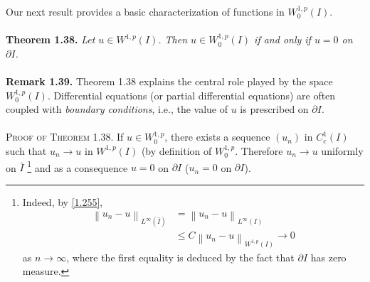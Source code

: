 \documentclass[a4paper,oneside]{article}
\numberwithin{equation}{section}
\begin{document}
Our next result provides a basic characterization of functions in $W_0^{1,p}\left(I\right)$.\\
\\
\textbf{Theorem 1.38.} \textit{Let $u\in W^{1,p}\left(I\right)$. Then $u\in W_0^{1,p}\left(I\right)$ if and only if $u=0$ on $\partial I$.}\\
\\
\textbf{Remark 1.39.} Theorem 1.38 explains the central role played by the space $W_0^{1,p}\left(I\right)$. Differential equations (or partial differential equations) are often coupled with \textit{boundary conditions}, i.e., the value of $u$ is prescribed on $\partial I$.\\
\\
\textsc{Proof of Theorem 1.38.} If $u\in W_0^{1,p}$, there exists a sequence $\left(u_n\right)$ in $C_c^1\left(I\right)$ such that $u_n\to u$ in $W^{1,p}\left(I\right)$ (by definition of $W_0^{1,p}$. Therefore $u_n\to u$ uniformly on $\bar{I}$  \footnote{Indeed, by \eqref{1.255}, 
\begin{align}
{\left\| {{u_n} - u} \right\|_{{L^\infty }\left( {\bar I} \right)}} &= {\left\| {{u_n} - u} \right\|_{{L^\infty }\left( I \right)}}\\
 &\le C{\left\| {{u_n} - u} \right\|_{{W^{1,p}}\left( I \right)}} \to 0
\end{align}
as $n\to \infty$, where the first equality is deduced by the fact that $\partial I$ has zero measure.} and as a consequence $u=0$ on $\partial I$ ($u_n=0$ on $\partial I$).
\end{document}
